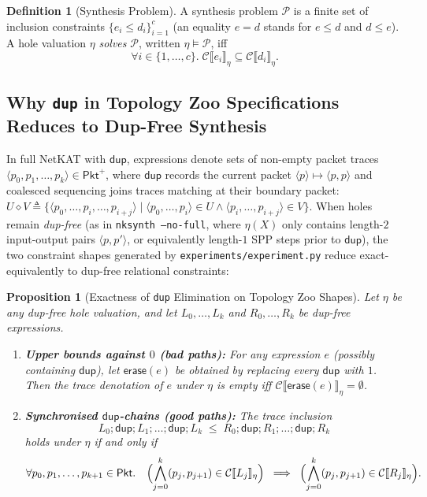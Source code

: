 \documentclass[11pt,a4paper]{article}
\newtheorem{proposition}[theorem]{Proposition}
\theoremstyle{definition}
\newtheorem{definition}[theorem]{Definition}
\theoremstyle{remark}
\newcommand{\Pkt}{\mathsf{Pkt}}
\newcommand{\Csem}[1]{\mathcal{C}\llbracket #1 \rrbracket}
\begin{document}
\begin{definition}[Synthesis Problem]
A synthesis problem $\mathcal{P}$ is a finite set of inclusion constraints $\{e_i \le d_i\}_{i=1}^c$
(an equality $e = d$ stands for $e \le d$ and $d \le e$). A hole valuation $\eta$ \emph{solves}
$\mathcal{P}$, written $\eta \models \mathcal{P}$, iff
\[
  \forall i \in \{1, \dots, c\}.\; \Csem{e_i}_\eta \subseteq \Csem{d_i}_\eta.
\]
\end{definition}

\subsection{Why \texttt{dup} in Topology Zoo Specifications Reduces to Dup-Free Synthesis}

In full NetKAT with $\mathsf{dup}$, expressions denote sets of non-empty packet traces
$\langle p_0, p_1, \dots, p_k \rangle \in \Pkt^+$, where $\mathsf{dup}$ records the current packet
$\langle p \rangle \mapsto \langle p, p \rangle$ and coalesced sequencing joins traces matching at
their boundary packet:
$U \diamond V \triangleq \{\langle p_0, \dots, p_i, \dots, p_{i+j} \rangle \mid
\langle p_0, \dots, p_i \rangle \in U \land \langle p_i, \dots, p_{i+j} \rangle \in V\}$.
When holes remain \emph{dup-free} (as in \texttt{nksynth --no-full}, where $\eta(X)$ only contains
length-$2$ input-output pairs $\langle p, p' \rangle$, or equivalently length-$1$ SPP steps prior to
$\mathsf{dup}$), the two constraint shapes generated by \texttt{experiments/experiment.py} reduce
exact-equivalently to dup-free relational constraints:

\begin{proposition}[Exactness of \texttt{dup} Elimination on Topology Zoo Shapes]
Let $\eta$ be any dup-free hole valuation, and let $L_0, \dots, L_k$ and $R_0, \dots, R_k$ be
dup-free expressions.
\begin{enumerate}[label=(\arabic*)]
  \item \textbf{Upper bounds against $0$ (bad paths):} For any expression $e$ (possibly containing
        $\mathsf{dup}$), let $\mathsf{erase}(e)$ be obtained by replacing every $\mathsf{dup}$ with $1$.
        Then the trace denotation of $e$ under $\eta$ is empty iff $\Csem{\mathsf{erase}(e)}_\eta = \emptyset$.
  \item \textbf{Synchronised $\mathsf{dup}$-chains (good paths):} The trace inclusion
        \[
          L_0 ; \mathsf{dup} ; L_1 ; \dots ; \mathsf{dup} ; L_k \;\le\;
          R_0 ; \mathsf{dup} ; R_1 ; \dots ; \mathsf{dup} ; R_k
        \]
        holds under $\eta$ if and only if
        \[
          \forall p_0, p_1, \dots, p_{k+1} \in \Pkt.\quad
          \Bigl(\bigwedge_{j=0}^{k} (p_j, p_{j+1}) \in \Csem{L_j}_\eta\Bigr) \;\implies\;
          \Bigl(\bigwedge_{j=0}^{k} (p_j, p_{j+1}) \in \Csem{R_j}_\eta\Bigr).
        \]
\end{enumerate}
\end{proposition}
\end{document}
